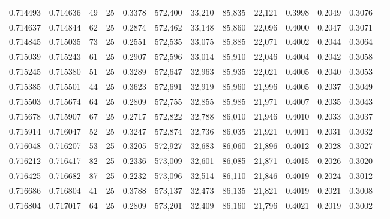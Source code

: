 \begin{tabular}{rrrrrrrrrrrrr}
0.714493 & 0.714636 &    49 &  25 &                                     0.3378 & 572,400 &  33,210 &  85,835 &  22,121 & 0.3998 & 0.2049 & 0.3076 \\
0.714637 & 0.714844 &    62 &  25 &                                     0.2874 & 572,462 &  33,148 &  85,860 &  22,096 & 0.4000 & 0.2047 & 0.3071 \\
0.714845 & 0.715035 &    73 &  25 &                                     0.2551 & 572,535 &  33,075 &  85,885 &  22,071 & 0.4002 & 0.2044 & 0.3064 \\
0.715039 & 0.715243 &    61 &  25 &                                     0.2907 & 572,596 &  33,014 &  85,910 &  22,046 & 0.4004 & 0.2042 & 0.3058 \\
0.715245 & 0.715380 &    51 &  25 &                                     0.3289 & 572,647 &  32,963 &  85,935 &  22,021 & 0.4005 & 0.2040 & 0.3053 \\
0.715385 & 0.715501 &    44 &  25 &                                     0.3623 & 572,691 &  32,919 &  85,960 &  21,996 & 0.4005 & 0.2037 & 0.3049 \\
0.715503 & 0.715674 &    64 &  25 &                                     0.2809 & 572,755 &  32,855 &  85,985 &  21,971 & 0.4007 & 0.2035 & 0.3043 \\
0.715678 & 0.715907 &    67 &  25 &                                     0.2717 & 572,822 &  32,788 &  86,010 &  21,946 & 0.4010 & 0.2033 & 0.3037 \\
0.715914 & 0.716047 &    52 &  25 &                                     0.3247 & 572,874 &  32,736 &  86,035 &  21,921 & 0.4011 & 0.2031 & 0.3032 \\
0.716048 & 0.716207 &    53 &  25 &                                     0.3205 & 572,927 &  32,683 &  86,060 &  21,896 & 0.4012 & 0.2028 & 0.3027 \\
0.716212 & 0.716417 &    82 &  25 &                                     0.2336 & 573,009 &  32,601 &  86,085 &  21,871 & 0.4015 & 0.2026 & 0.3020 \\
0.716425 & 0.716682 &    87 &  25 &                                     0.2232 & 573,096 &  32,514 &  86,110 &  21,846 & 0.4019 & 0.2024 & 0.3012 \\
0.716686 & 0.716804 &    41 &  25 &                                     0.3788 & 573,137 &  32,473 &  86,135 &  21,821 & 0.4019 & 0.2021 & 0.3008 \\
0.716804 & 0.717017 &    64 &  25 &                                     0.2809 & 573,201 &  32,409 &  86,160 &  21,796 & 0.4021 & 0.2019 & 0.3002 \\

\end{tabular}
